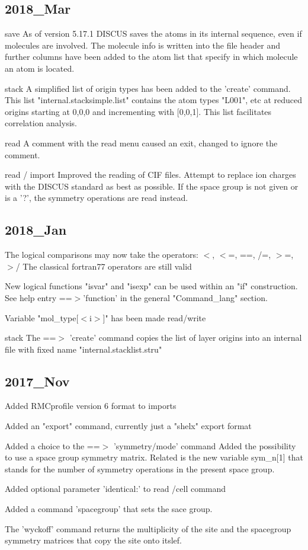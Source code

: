 \subsection*{2018\_Mar}
\par
save 
As of version 5.17.1 DISCUS saves the atoms in its internal 
sequence, even if molecules are involved. The molecule info 
is written into the file header and further columns have been 
added to the atom list that specify in which molecule an atom 
is located. 
\par
stack 
A simplified list of origin types has been added to the 
'create' command. This list "internal.stacksimple.list" 
contains the atom types "L001", etc at reduced origins 
starting at 0,0,0 and incrementing with [0,0,1]. This 
list facilitates correlation analysis. 
\par
read 
A comment with the read menu caused an exit, changed to 
ignore the comment. 
\par
read / import 
Improved the reading of CIF files. Attempt to replace ion 
charges with the DISCUS standard as best as possible. 
If the space group is not given or is a '?', the symmetry 
operations are read instead. 
\subsection*{2018\_Jan}
\par
The logical comparisons may now take the operators: 
$ <$, $ <$=, ==, /=, $> $=, $> $/ 
The classical fortran77 operators are still valid 
\par
New logical functions "isvar" and "isexp" can be used within an 
"if" construction. See help entry ==$> $'function' in the 
general "Command\_lang" section. 
\par
Variable "mol\_type[$ <$i$> $]" has been made read/write 
\par
stack 
The ==$> $ 'create' command copies the list of layer origins 
into an internal file with fixed name "internal.stacklist.stru" 
\subsection*{2017\_Nov}
\par
Added RMCprofile version 6 format to imports 
\par
Added an "export" command, currently just a "shelx" export format 
\par
Added a choice to the ==$> $ 'symmetry/mode' command 
Added the possibility to use a space group symmetry matrix. 
Related is the new variable sym\_n[1] that stands for the 
number of symmetry operations in the present space group. 
\par
Added optional parameter 'identical:' to read /cell command 
\par
Added a command 'spacegroup' that sets the sace group. 
\par
The 'wyckoff' command returns the multiplicity of the site and 
the spacegroup symmetry matrices that copy the site onto itslef. 
